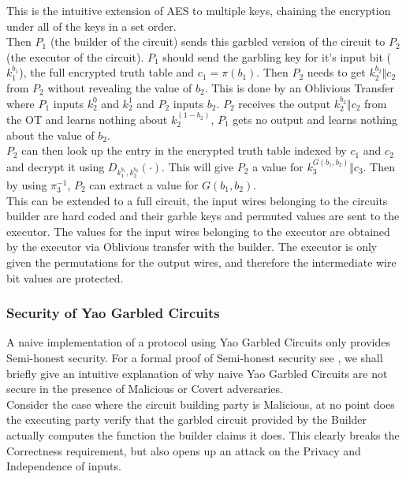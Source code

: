 \documentclass[a4paper,10pt]{article}
\begin{document}
				This is the intuitive extension of AES to multiple keys, chaining the encryption under all of the keys in a set order.\\

				Then $P_1$ (the builder of the circuit) sends this garbled version of the circuit to $P_2$ (the executor of the circuit). $P_1$ should send the garbling key for it's input bit ($k_1^{b_1}$), the full encrypted truth table and $c_1 = \pi(b_1)$. Then $P_2$ needs to get $k_2^{b_2} \Vert c_2$ from $P_2$ without revealing the value of $b_2$. This is done by an Oblivious Transfer where $P_1$ inputs $k_2^0$ and $k_2^1$ and $P_2$ inputs $b_2$. $P_2$ receives the output $k_2^{b_2} \Vert c_2$ from the OT and learns nothing about $k_2^{(1 - b_2)} $, $P_1$ gets no output and learns nothing about the value of $b_2$.\\

				$P_2$ can then look up the entry in the encrypted truth table indexed by $c_1$ and $c_2$ and decrypt it using $D_{k_1^{b_1}, k_2^{b_2}}(\cdot)$. This will give $P_2$ a value for $k_3^{G(b_1, b_2)} \Vert c_3$. Then by using $\pi_3^{-1}$, $P_2$ can extract a value for $G(b_1, b_2)$.\\

				This can be extended to a full circuit, the input wires belonging to the circuits builder are hard coded and their garble keys and permuted values are sent to the executor. The values for the input wires belonging to the executor are obtained by the executor via Oblivious transfer with the builder. The executor is only given the permutations for the output wires, and therefore the intermediate wire bit values are protected.

			\subsubsection{Security of Yao Garbled Circuits}
				A naive implementation of a protocol using Yao Garbled Circuits only provides Semi-honest security. For a formal proof of Semi-honest security see \cite{ProofOfYaoSecurity}, we shall briefly give an intuitive explanation of why naive Yao Garbled Circuits are not secure in the presence of Malicious or Covert adversaries.\\

				Consider the case where the circuit building party is Malicious, at no point does the executing party verify that the garbled circuit provided by the Builder actually computes the function the builder claims it does. This clearly breaks the Correctness requirement, but also opens up an attack on the Privacy and Independence of inputs.\\
\end{document}
